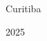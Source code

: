 \begin{folharosto}

\begin{center}
\theauthor \\
\theauthorr \\
\theauthorrr \\
\theauthorrrr \\
\theauthorrrrr \\
\end{center}
\ \\
\ \\
\ \\
\ \\
\ \\
\begin{spacing}{2}
   \begin{center}
   {\LARGE {\bf \thetitle}}
   \end{center}
\end{spacing}
\ \\
\ \\
\ \\
\vspace*{85mm}







\ \\
\ \\
\ \\
\ \\
   \begin{center}
   Curitiba \par
   \theuniversity \par
   2025
   \end{center}

\end{folharosto}
